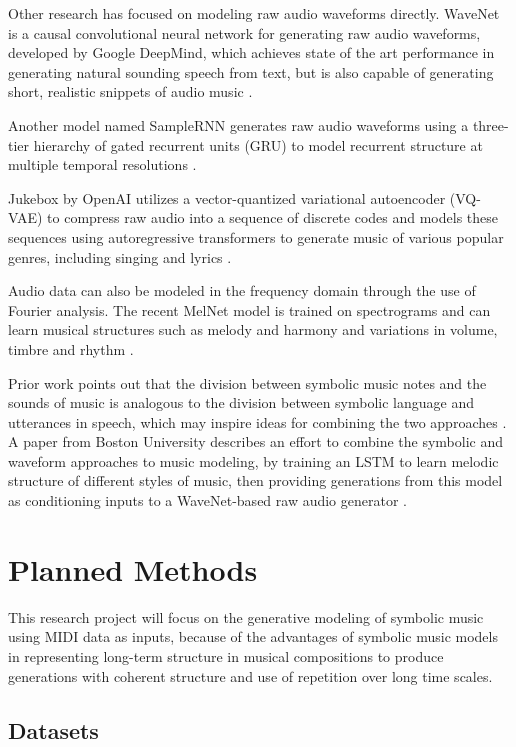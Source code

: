 \documentclass[sigconf,authorversion]{acmart}
\begin{document}
Other research has focused on modeling raw audio waveforms directly. WaveNet is
a causal convolutional neural network for generating raw audio waveforms,
developed by Google DeepMind, which achieves state of the art performance in
generating natural sounding speech from text, but is also capable of generating
short, realistic snippets of audio music \cite{oord_wavenet_2016}.

Another model named SampleRNN generates raw audio waveforms using a three-tier
hierarchy of gated recurrent units (GRU) to model recurrent structure at
multiple temporal resolutions \cite{mehri_samplernn_2017}.

Jukebox by OpenAI utilizes a vector-quantized variational autoencoder
(VQ-VAE) to compress raw audio into a sequence of discrete codes and
models these sequences using autoregressive transformers to generate
music of various popular genres, including singing and lyrics
\cite{dhariwal2020jukebox}.

Audio data can also be modeled in the frequency domain through the use of
Fourier analysis. The recent MelNet model is trained on spectrograms and can
learn musical structures such as melody and harmony and variations in volume,
timbre and rhythm \cite{vasquez2019melnet}.

Prior work points out that the division between symbolic music notes
and the sounds of music is analogous to the division between symbolic
language and utterances in speech, which may inspire ideas for
combining the two approaches \cite{hawthorne2019enabling}. A paper
from Boston University describes an effort to combine the symbolic and
waveform approaches to music modeling, by training an LSTM to learn
melodic structure of different styles of music, then providing
generations from this model as conditioning inputs to a WaveNet-based
raw audio generator \cite{manzelli_conditioning_2018}.

\section{Planned Methods}

This research project will focus on the generative modeling of
symbolic music using MIDI data as inputs, because of the advantages of
symbolic music models in representing long-term structure in musical
compositions to produce generations with coherent structure and use of
repetition over long time scales.

\subsection{Datasets}
\end{document}
